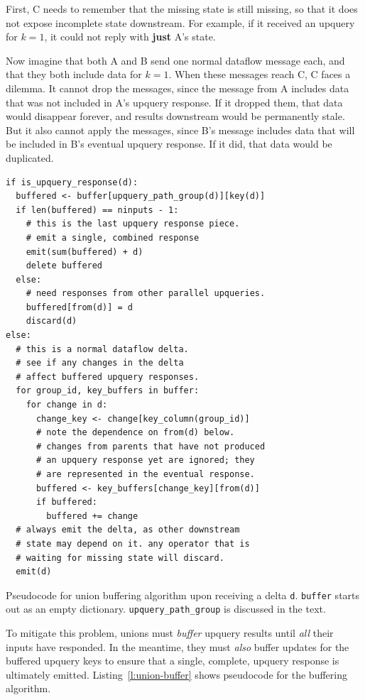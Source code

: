 First, C needs to remember that the missing state is still missing, so that it
does not expose incomplete state downstream. For example, if it received an
upquery for $k = 1$, it could not reply with \textbf{just} A's state.

Now imagine that both A and B send one normal dataflow message each, and that
they both include data for $k = 1$. When these messages reach C, C faces a
dilemma. It cannot drop the messages, since the message from A includes data
that was not included in A's upquery response. If it dropped them, that data
would disappear forever, and results downstream would be permanently stale. But
it also cannot apply the messages, since B's message includes data that will be
included in B's eventual upquery response. If it did, that data would be
duplicated.

\begin{listing}[h]
  \begin{verbatim}
if is_upquery_response(d):
  buffered <- buffer[upquery_path_group(d)][key(d)]
  if len(buffered) == ninputs - 1:
    # this is the last upquery response piece.
    # emit a single, combined response
    emit(sum(buffered) + d)
    delete buffered
  else:
    # need responses from other parallel upqueries.
    buffered[from(d)] = d
    discard(d)
else:
  # this is a normal dataflow delta.
  # see if any changes in the delta
  # affect buffered upquery responses.
  for group_id, key_buffers in buffer:
    for change in d:
      change_key <- change[key_column(group_id)]
      # note the dependence on from(d) below.
      # changes from parents that have not produced
      # an upquery response yet are ignored; they
      # are represented in the eventual response.
      buffered <- key_buffers[change_key][from(d)]
      if buffered:
        buffered += change
  # always emit the delta, as other downstream
  # state may depend on it. any operator that is
  # waiting for missing state will discard.
  emit(d)
  \end{verbatim}
  \caption{Pseudocode for union buffering algorithm upon receiving a delta
  \texttt{d}. \texttt{buffer} starts out as an empty dictionary.
  \texttt{upquery\_path\_group} is discussed in the text.}
  \label{l:union-buffer}
\end{listing}

To mitigate this problem, unions must \textit{buffer} upquery results until
\emph{all} their inputs have responded. In the meantime, they must \emph{also}
buffer updates for the buffered upquery keys to ensure that a single, complete,
upquery response is ultimately emitted. Listing~\ref{l:union-buffer} shows
pseudocode for the buffering algorithm.

